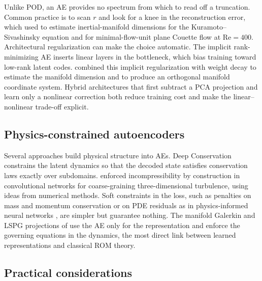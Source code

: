 Unlike POD, an AE provides no spectrum from which to read off a truncation.
Common practice is to scan $r$ and look for a knee in the reconstruction
error, which \textcite{linot2020inertial,linot2022node} used to estimate
inertial-manifold dimensions for the Kuramoto--Sivashinsky equation and
\textcite{linot2023couette} for minimal-flow-unit plane Couette flow at
$\mathrm{Re}=400$. Architectural regularization can make the choice
automatic. The implicit rank-minimizing AE \parencite{jing2020irmae} inserts
linear layers in the bottleneck, which bias training toward low-rank latent
codes. \textcite{zeng2024autoencoders} combined this implicit regularization
with weight decay to estimate the manifold dimension and to produce an
orthogonal manifold coordinate system. Hybrid architectures that first
subtract a PCA projection and learn only a nonlinear correction
\parencite{linot2020inertial} both reduce training cost and make the
linear--nonlinear trade-off explicit.

\subsection{Physics-constrained autoencoders}

Several approaches build physical structure into AEs. Deep Conservation
\parencite{lee2021deepconservation} constrains the latent dynamics so that
the decoded state satisfies conservation laws exactly over subdomains.
\textcite{mohan2020embedding} enforced incompressibility by construction in
convolutional networks for coarse-graining three-dimensional turbulence, using
ideas from numerical methods. Soft constraints in the loss, such as penalties
on mass and momentum conservation \parencite{lee2019cylinder} or on PDE
residuals as in physics-informed neural networks \parencite{raissi2019pinn},
are simpler but guarantee nothing. The manifold Galerkin and LSPG projections
of \textcite{lee2020cae} use the AE only for the representation and enforce the
governing equations in the dynamics, the most direct link between learned
representations and classical ROM theory.

\subsection{Practical considerations}

